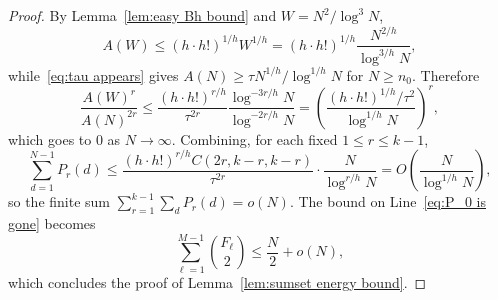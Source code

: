 \documentclass[10pt,a4paper]{amsart}
\begin{document}
\begin{proof}
By Lemma~\ref{lem:easy Bh bound} and
$W=N^2/\log^3 N$,
\[
   A(W)\le(h\cdot h!)^{1/h}W^{1/h}
   =(h\cdot h!)^{1/h} \frac{N^{2/h}}{\log^{3/h} N},
\]
while~\eqref{eq:tau appears} gives $A(N)\ge \tau N^{1/h}/\log^{1/h} N$ for
$N\ge n_0$.  Therefore
\[
   \frac{A(W)^{r}}{A(N)^{2r}}
   \le\frac{(h\cdot h!)^{r/h}}{\tau^{2r}} 
     \frac{\log^{-3r/h} N}{\log^{-2r/h} N}
   =\left(\frac{(h\cdot h!)^{1/h} / \tau^{2}}{\log^{1/h} N}\right)^r,
\]
which goes to $0$ as $N\to \infty$.
Combining, for each fixed $1\le r\le k-1$,
  \[
   \sum_{d=1}^{N-1}P_r(d)
   \le\frac{(h\cdot h!)^{r/h} C(2r,k-r,k-r)}{\tau^{2r}}\cdot
     \frac{N}{\log^{r/h} N}=O\left(\frac{N}{\log^{1/h} N}\right),
  \]
so the finite sum $\sum_{r=1}^{k-1}\sum_{d}P_r(d)=o(N)$.  The bound on Line~\eqref{eq:P_0 is gone} becomes
  \[   \sum_{\ell=1}^{M-1}\binom{F_\ell}{2}\le\frac{N}{2}+o(N), \]
which concludes the proof of Lemma~\ref{lem:sumset energy bound}.
\end{proof}
\end{document}
